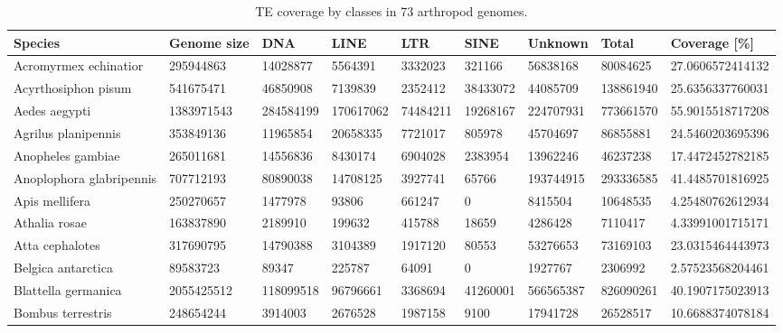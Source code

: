 \begin{table}[]
\caption[TE coverage data]{{TE coverage by classes in 73 arthropod
genomes.%
\label{tab:coverage}}}
\begin{tabular}{@{}lllllllll@{}}
\toprule
Species                    & Genome size & DNA       & LINE      & LTR       & SINE      & Unknown    & Total      & Coverage {[}\%{]} \\ \midrule
Acromyrmex echinatior      & 295944863   & 14028877  & 5564391   & 3332023   & 321166    & 56838168   & 80084625   & 27.0606572414132  \\
Acyrthosiphon pisum        & 541675471   & 46850908  & 7139839   & 2352412   & 38433072  & 44085709   & 138861940  & 25.6356337760031  \\
Aedes aegypti              & 1383971543  & 284584199 & 170617062 & 74484211  & 19268167  & 224707931  & 773661570  & 55.9015518717208  \\
Agrilus planipennis        & 353849136   & 11965854  & 20658335  & 7721017   & 805978    & 45704697   & 86855881   & 24.5460203695396  \\
Anopheles gambiae          & 265011681   & 14556836  & 8430174   & 6904028   & 2383954   & 13962246   & 46237238   & 17.4472452782185  \\
Anoplophora glabripennis   & 707712193   & 80890038  & 14708125  & 3927741   & 65766     & 193744915  & 293336585  & 41.4485701816925  \\
Apis mellifera             & 250270657   & 1477978   & 93806     & 661247    & 0         & 8415504    & 10648535   & 4.25480762612934  \\
Athalia rosae              & 163837890   & 2189910   & 199632    & 415788    & 18659     & 4286428    & 7110417    & 4.33991001715171  \\
Atta cephalotes            & 317690795   & 14790388  & 3104389   & 1917120   & 80553     & 53276653   & 73169103   & 23.0315464443973  \\
Belgica antarctica         & 89583723    & 89347     & 225787    & 64091     & 0         & 1927767    & 2306992    & 2.57523568204461  \\
Blattella germanica        & 2055425512  & 118099518 & 96796661  & 3368694   & 41260001  & 566565387  & 826090261  & 40.1907175023913  \\
Bombus terrestris          & 248654244   & 3914003   & 2676528   & 1987158   & 9100      & 17941728   & 26528517   & 10.6688374078184  \\

\end{tabular}
\end{table}
